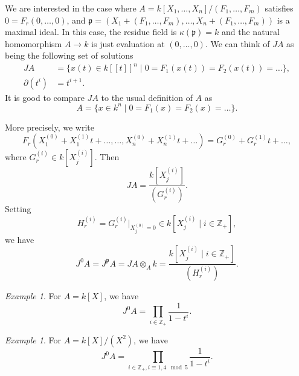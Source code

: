 \documentclass[a4paper, 12pt, reqno]{amsart}
\theoremstyle{remark}
\newtheorem{example}[theorem]{Example}
\begin{document}
We are interested in the case where $A = k[X_1, \dots, X_n]/(F_1, \dots, F_m)$ satisfies $0 = F_r(0, \dots, 0)$, and $\mathfrak{p} = (X_1 + (F_1, \dots, F_m), \dots, X_n + (F_1, \dots, F_m))$ is a maximal ideal.
In this case, the residue field is $\kappa(\mathfrak{p}) = k$ and the natural homomorphism $A \to k$ is just evaluation at $(0, \dots, 0)$.
We can think of $JA$ as being the following set of solutions
\begin{align*}
  JA &= \{x(t) \in k[[t]]^n \mid 0 = F_1(x(t)) = F_2(x(t)) = \dots \}, \\
  \partial(t^i) &= t^{i + 1}.
\end{align*}
It is good to compare $JA$ to the usual definition of $A$ as
\begin{equation*}
  A = \{x \in k^n \mid 0 = F_1(x) = F_2(x) = \dots\}.
\end{equation*}

More precisely, we write
\begin{equation*}
  F_r(X_1^{(0)} + X_1^{(1)}t + \dots, \dots, X_n^{(0)} + X_n^{(1)}t + \dots) = G_r^{(0)} + G_r^{(1)}t + \dots,
\end{equation*}
where $G_r^{(i)} \in k[X^{(i)}_j]$.
Then
\begin{equation*}
  JA = \frac{k[X^{(i)}_j]}{(G^{(i)}_r)}.
\end{equation*}
Setting
\begin{equation*}
  H^{(i)}_r = G_r^{(i)}|_{X^{(0)}_j = 0} \in k[X^{(i)}_j \mid i \in \mathbb{Z}_+], 
\end{equation*}
we have
\begin{equation*}
  J^0A = J^{\mathfrak{p}}A = JA \otimes_A k = \frac{k[X^{(i)}_j \mid i \in \mathbb{Z}_+]}{(H^{(i)}_r)}.
\end{equation*}

\begin{example}
  \label{exa:1}
  For $A = k[X]$, we have
  \begin{equation*}
    J^0A = \prod_{i \in \mathbb{Z}_+}\frac{1}{1 - t^i}.
  \end{equation*}
\end{example}

\begin{example}
  \label{exa:2}
  For $A = k[X]/(X^2)$, we have
  \begin{equation*}
    J^0A = \prod_{i \in \mathbb{Z}_+, i \equiv 1, 4 \mod 5}\frac{1}{1 - t^i}.
  \end{equation*}
\end{example}
\end{document}
